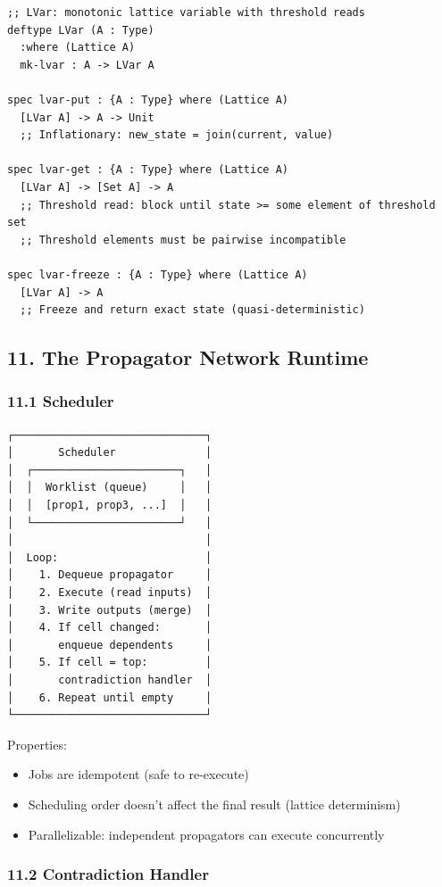 \documentclass[11pt]{article}
\begin{document}
\begin{verbatim}
;; LVar: monotonic lattice variable with threshold reads
deftype LVar (A : Type)
  :where (Lattice A)
  mk-lvar : A -> LVar A

spec lvar-put : {A : Type} where (Lattice A)
  [LVar A] -> A -> Unit
  ;; Inflationary: new_state = join(current, value)

spec lvar-get : {A : Type} where (Lattice A)
  [LVar A] -> [Set A] -> A
  ;; Threshold read: block until state >= some element of threshold set
  ;; Threshold elements must be pairwise incompatible

spec lvar-freeze : {A : Type} where (Lattice A)
  [LVar A] -> A
  ;; Freeze and return exact state (quasi-deterministic)
\end{verbatim}
\subsection{11. The Propagator Network Runtime}
\label{sec:orgf41ca3b}

\subsubsection{11.1 Scheduler}
\label{sec:org6aa6b4c}

\begin{verbatim}
┌──────────────────────────────┐
│       Scheduler              │
│  ┌───────────────────────┐   │
│  │  Worklist (queue)     │   │
│  │  [prop1, prop3, ...]  │   │
│  └───────────────────────┘   │
│                              │
│  Loop:                       │
│    1. Dequeue propagator     │
│    2. Execute (read inputs)  │
│    3. Write outputs (merge)  │
│    4. If cell changed:       │
│       enqueue dependents     │
│    5. If cell = top:         │
│       contradiction handler  │
│    6. Repeat until empty     │
└──────────────────────────────┘
\end{verbatim}

Properties:
\begin{itemize}
\item Jobs are idempotent (safe to re-execute)
\item Scheduling order doesn't affect the final result (lattice determinism)
\item Parallelizable: independent propagators can execute concurrently
\end{itemize}
\subsubsection{11.2 Contradiction Handler}
\label{sec:orgb09b769}
\end{document}
